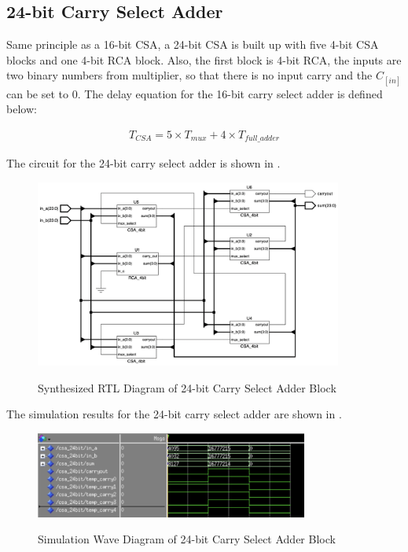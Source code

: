 \subsection{24-bit Carry Select Adder}


Same principle as a 16-bit CSA, a 24-bit CSA is built up with five 4-bit CSA blocks and one 4-bit RCA block.
Also, the first block is 4-bit RCA, the inputs are two binary numbers from multiplier,
so that there is no input carry and the \(C_[in]\) can be set to 0.
The delay equation for the 16-bit carry select adder is defined below:

\begin{equation}
	\begin{array}{c}
		T_{CSA} = 5 \times T_{mux} + 4 \times T_{full\_adder}
	\end{array}
	\label{exp:csa_24b_delay_exp}
\end{equation}

\noindent The circuit for the 24-bit carry select adder is shown in .

\begin{figure}[!htp]
	\centering
	\caption{Synthesized RTL Diagram of 24-bit Carry Select Adder Block}
	\includegraphics[width=0.9\textwidth]{../img/csa_24_rtl.png}
	\label{fig:csa_24_rtl}
\end{figure}

\noindent The simulation results for the 24-bit carry select adder are shown in .

\begin{figure}[!htp]
	\centering
	\caption{Simulation Wave Diagram of 24-bit Carry Select Adder Block}
	\includegraphics[width=0.8\textwidth]{../img/csa_24_sim.png}
	\label{fig:csa_24_sim}
\end{figure}

